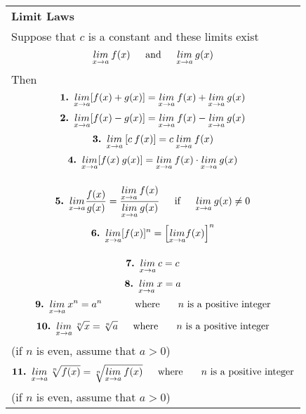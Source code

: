 \documentclass[fleqn]{article}
\begin{document}
\begin{center}
\large
\def\arraystretch{1.3}
{\setlength{\tabcolsep}{16pt}
\begin{tabularx}{.9\textwidth}{|X|}
\hline
	\vspace{1pt}
	\textbf{Limit Laws} \\
	Suppose that $c$ is a constant and these limits exist
	$$\underset{x \to a}{lim} \: f(x) \text{\hspace{12pt} and \hspace{12pt}} \underset{x \to a}{lim} \: g(x)$$
	Then
	\[\text{\textbf{1. }} \underset{x \to a}{lim} [f(x) + g(x)] = \underset{x \to a}{lim} \: f(x) + \underset{x \to a}{lim} \: g(x)\]
	\[\text{\textbf{2. }} \underset{x \to a}{lim} [f(x) - g(x)] = \underset{x \to a}{lim} \: f(x) - \underset{x \to a}{lim} \: g(x)\] 
	\[\text{\textbf{3. }} \underset{x \to a}{lim} \: [c \: f(x)] = c \: \underset{x \to a}{lim} \: f(x) \] 
	\[\text{\textbf{4. }} \underset{x \to a}{lim} [f(x) \: g(x)] = \underset{x \to a}{lim} \: f(x) \cdot \underset{x \to a}{lim} \: g(x)\] \\[-32pt] 
	\[\text{\textbf{5. }} \underset{x \to a}{lim} \dfrac{f(x)}{g(x)} = \dfrac{\underset{x \to a}{lim} \: f(x)}{\underset{x \to a}{lim} \: g(x)} \text{\hspace{12pt} if \hspace{12pt}} \underset{x \to a}{lim} \: g(x) \ne 0 \] 
	\[\text{\textbf{6. }} \underset{x \to a}{lim} [f(x)]^n = \Big[\underset{x \to a}{lim} f(x) \Big]^n \] \\[-32pt]
	\[\text{\textbf{7. }} \underset{x \to a}{lim} \: c = c \] 
	\[\text{\textbf{8. }} \underset{x \to a}{lim} \: x = a \] 
	\[\text{\textbf{9. }} \underset{x \to a}{lim} \: x^n = a^n \text{\hspace{30pt} where \hspace{12pt} $n$ is a positive integer}\] 
	\[\text{\textbf{10. }} \underset{x \to a}{lim} \: \sqrt[n]{x} = \sqrt[n]{a} \text{\hspace{12pt} where \hspace{12pt} $n$ is a positive integer}\] 
	\hspace{135pt}(if $n$ is even, assume that $a > 0$)
	\[\text{\textbf{11. }} \underset{x \to a}{lim} \: \sqrt[n]{f(x)} = \sqrt[n]{\underset{x \to a}{lim} \: f(x)} \text{\hspace{12pt} where \hspace{12pt} $n$ is a positive integer}\] 
	\hspace{195pt}(if $n$ is even, assume that $a > 0$) \\
\hline
\end{tabularx}}
\vspace{12pt}


\end{center}
\end{document}
